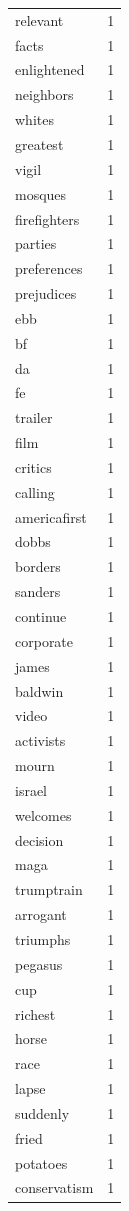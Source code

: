 \begin{tabular}{lr}
relevant & 1 \\
facts & 1 \\
enlightened & 1 \\
neighbors & 1 \\
whites & 1 \\
greatest & 1 \\
vigil & 1 \\
mosques & 1 \\
firefighters & 1 \\
parties & 1 \\
preferences & 1 \\
prejudices & 1 \\
ebb & 1 \\
bf & 1 \\
da & 1 \\
fe & 1 \\
trailer & 1 \\
film & 1 \\
critics & 1 \\
calling & 1 \\
americafirst & 1 \\
dobbs & 1 \\
borders & 1 \\
sanders & 1 \\
continue & 1 \\
corporate & 1 \\
james & 1 \\
baldwin & 1 \\
video & 1 \\
activists & 1 \\
mourn & 1 \\
israel & 1 \\
welcomes & 1 \\
decision & 1 \\
maga & 1 \\
trumptrain & 1 \\
arrogant & 1 \\
triumphs & 1 \\
pegasus & 1 \\
cup & 1 \\
richest & 1 \\
horse & 1 \\
race & 1 \\
lapse & 1 \\
suddenly & 1 \\
fried & 1 \\
potatoes & 1 \\
conservatism & 1 \\

\end{tabular}
